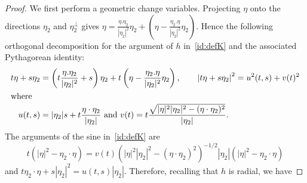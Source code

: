 \documentclass[10pt]{amsart}
\theoremstyle{definition}\newtheorem{defi}[theo]{Definition}\newtheorem{rema}[theo]{Remark}\newtheorem{exam}[theo]{Example}\newtheorem{exem}[theo]{Example}\newtheorem{nota}[theo]{Notation}
\begin{document}
\begin{proof}
We first perform a geometric change variables. Projecting $\eta$ onto the directions $\eta_2$ and $\eta_2^\perp$ gives $\eta=\tfrac{\eta.\eta_2}{|\eta_2|^2}\eta_2+(\eta-\tfrac{\eta_2.\eta}{|\eta_2|^2}\eta_2)$. Hence the following orthogonal decomposition for the argument of $h$ in~\eqref{id:defK} and the associated Pythagorean identity:
\begin{align*}
t\eta + s \eta_2 &=\left(t\frac{\eta.\eta_2}{|\eta_2|^2}+s\right)\eta_2+t\left(\eta-\frac{\eta_2.\eta}{|\eta_2|^2}\eta_2\right), \qquad \left|t\eta + s \eta_2\right|^2= u^2(t,s)+v(t)^2
\\
\intertext{where}
u (t,s) &= |\eta_2|s + t \frac{\eta\cdot \eta_2}{|\eta_2|} \textrm{ and }v(t) = t \frac{\sqrt{|\eta|^2|\eta_2|^2- (\eta\cdot\eta_2)^2}}{|\eta_2|}.
\end{align*}
The arguments of the sine in~\eqref{id:defK} are
\[
t\left(|\eta|^2-\eta_2\cdot \eta\right)=v(t)\left(|\eta|^2|\eta_2|^2- \left(\eta\cdot\eta_2\right)^2\right)^{-1/2}|\eta_2|\left(|\eta|^2-\eta_2\cdot \eta\right)
\]
and $t\eta_2\cdot \eta + s|\eta_2|^2=u(t,s)|\eta_2|$. Therefore, recalling that $h$ is radial, we have


\end{proof}
\end{document}
